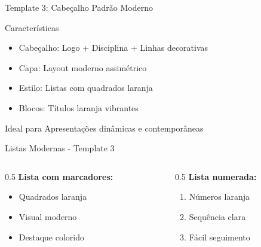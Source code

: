 \documentclass[aspectratio=169]{beamer}
\begin{document}
\begin{frame}{Template 3: Cabeçalho Padrão Moderno}
    \begin{block}{Características}
        \begin{itemize}
            \item Cabeçalho: Logo + Disciplina + Linhas decorativas
            \item Capa: Layout moderno assimétrico
            \item Estilo: Listas com quadrados laranja
            \item Blocos: Títulos laranja vibrantes
        \end{itemize}
    \end{block}
    
    \begin{alertblock}{Ideal para}
        Apresentações dinâmicas e contemporâneas
    \end{alertblock}
\end{frame}

\begin{frame}{Listas Modernas - Template 3}
    \begin{columns}
        \begin{column}{0.5\textwidth}
            \textbf{Lista com marcadores:}
            \begin{itemize}
                \item Quadrados laranja
                \item Visual moderno
                \item Destaque colorido
            \end{itemize}
        \end{column}
        \begin{column}{0.5\textwidth}
            \textbf{Lista numerada:}
            \begin{enumerate}
                \item Números laranja
                \item Sequência clara
                \item Fácil seguimento
            \end{enumerate}
        \end{column}
    \end{columns}
\end{frame}

\end{document}
